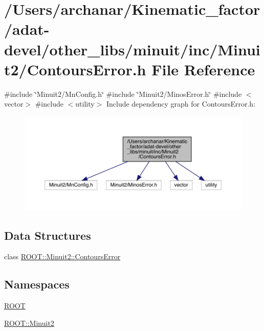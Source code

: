 \hypertarget{adat-devel_2other__libs_2minuit_2inc_2Minuit2_2ContoursError_8h}{}\section{/\+Users/archanar/\+Kinematic\+\_\+factor/adat-\/devel/other\+\_\+libs/minuit/inc/\+Minuit2/\+Contours\+Error.h File Reference}
\label{adat-devel_2other__libs_2minuit_2inc_2Minuit2_2ContoursError_8h}
{\ttfamily \#include \char`\"{}Minuit2/\+Mn\+Config.\+h\char`\"{}}\newline
{\ttfamily \#include \char`\"{}Minuit2/\+Minos\+Error.\+h\char`\"{}}\newline
{\ttfamily \#include $<$vector$>$}\newline
{\ttfamily \#include $<$utility$>$}\newline
Include dependency graph for Contours\+Error.\+h\+:
\nopagebreak
\begin{figure}[H]
\begin{center}
\leavevmode
\includegraphics[width=350pt]{d0/d64/adat-devel_2other__libs_2minuit_2inc_2Minuit2_2ContoursError_8h__incl}
\end{center}
\end{figure}
\subsection*{Data Structures}
\begin{DoxyCompactItemize}
\item 
class \mbox{\hyperlink{classROOT_1_1Minuit2_1_1ContoursError}{R\+O\+O\+T\+::\+Minuit2\+::\+Contours\+Error}}
\end{DoxyCompactItemize}
\subsection*{Namespaces}
\begin{DoxyCompactItemize}
\item 
 \mbox{\hyperlink{namespaceROOT}{R\+O\+OT}}
\item 
 \mbox{\hyperlink{namespaceROOT_1_1Minuit2}{R\+O\+O\+T\+::\+Minuit2}}
\end{DoxyCompactItemize}
